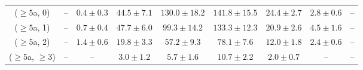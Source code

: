 \begin{table}[h!]
{\begin{tabular}{ccccccccc}
	($\ge5$a, 0) & -- & $0.4\pm 0.3$ & $44.5\pm 7.1$ & $130.0\pm 18.2$ & $141.8\pm 15.5$ & $24.4\pm 2.7$ & $2.8\pm 0.6$ & -- \\[0.5ex] 
	($\ge5$a, 1) & -- & $0.7\pm 0.4$ & $47.7\pm 6.0$ & $99.3\pm 14.2$ & $133.3\pm 12.3$ & $20.9\pm 2.6$ & $4.5\pm 1.6$ & -- \\[0.5ex] 
	($\ge5$a, 2) & -- & $1.4\pm 0.6$ & $19.8\pm 3.3$ & $57.2\pm 9.3$ & $78.1\pm 7.6$ & $12.0\pm 1.8$ & $2.4\pm 0.6$ & -- \\[0.5ex] 
	($\ge5$a, $\ge3$) & -- & -- & $3.0\pm 1.2$ & $5.7\pm 1.6$ & $10.7\pm 2.2$ & $2.0\pm 0.7$ & -- & -- \\[0.5ex] 
	\hline
	\hline
\end{tabular}}
\end{table}
